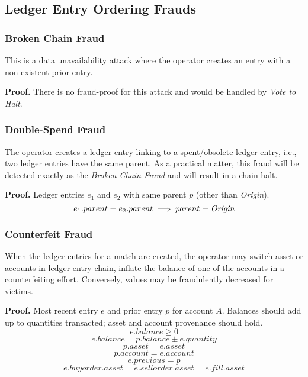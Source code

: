 \documentclass[12pt,a4paper]{article}
\begin{document}
\subsection{Ledger Entry Ordering Frauds}
\subsubsection{Broken Chain Fraud}\label{fp:bc}
This is a data unavailability attack where the operator creates an entry with a non-existent prior entry.

\textbf{Proof.} There is no fraud-proof for this attack and would be handled by \emph{Vote to Halt}.
\subsubsection{Double-Spend Fraud}\label{fp:dsf}
The operator creates a ledger entry linking to a spent/obsolete ledger entry, i.e., two ledger entries have the same parent. As a practical matter, this fraud will be detected exactly as the \emph{Broken Chain Fraud} and will result in a chain halt.

\textbf{Proof.} Ledger entries $e_1$ and $e_2$ with same parent $p$ (other than \emph{Origin}).
\begin{equation}
    e_1.parent = e_2.parent \implies parent = \emph{Origin}
\end{equation}
\subsubsection{Counterfeit Fraud} \label{fp:cff}
When the ledger entries for a match are created, the operator may switch asset or accounts in ledger entry chain, inflate the balance of one of the accounts in a counterfeiting effort. Conversely, values may be fraudulently decreased for victims.

\textbf{Proof.} 
Most recent entry $e$ and prior entry $p$ for account $A$. Balances should add up to quantities transacted; asset and account provenance should hold.
\begin{equation}e.balance \geq 0\end{equation}
\begin{equation}
  e.balance = p.balance \pm e.quantity  
\end{equation}
\begin{equation}p.asset = e.asset\end{equation}
\begin{equation}p.account = e.account\end{equation}
\begin{equation}e.previous = p\end{equation}
\begin{equation}
e.buyorder.asset = e.sellorder.asset = e.fill.asset
\end{equation}
\end{document}
